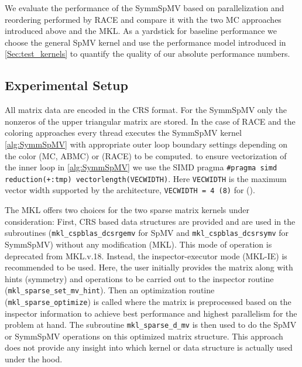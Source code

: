 
We evaluate the performance of the \acrshort{SymmSpMV} based on parallelization and reordering performed by \acrshort{RACE} and compare it with the two MC approaches introduced above and the \acrshort{MKL}. 
As a yardstick for baseline performance we choose the general \acrshort{SpMV} kernel and use the performance model introduced in \cref{Sec:test_kernels} to quantify the quality of our absolute performance numbers. 

\subsection{Experimental Setup}

All matrix data are encoded in the CRS format. For the \acrshort{SymmSpMV}  only the nonzeros of the upper triangular matrix are stored. In the case of RACE and the coloring approaches every thread executes the \acrshort{SymmSpMV} kernel \cref{alg:SymmSpMV} with appropriate outer loop boundary settings depending on the color (MC, ABMC) or \levelGroups (\acrshort{RACE}) to be computed. \Inorder to ensure vectorization of the inner loop in \cref{alg:SymmSpMV} we use the SIMD pragma \texttt{\#pragma simd reduction(+:tmp) vectorlength(VECWIDTH)}. Here \texttt{VECWIDTH} is the maximum vector width supported by the architecture, \ie \texttt{VECWIDTH = 4 (8)} for \IVB (\SKX).

The  \acrshort{MKL} offers two choices for the two sparse matrix kernels under consideration: First, CRS based data structures are provided and are used in the subroutines (\texttt{mkl\_cspblas\_dcsrgemv} for \acrshort{SpMV}  and  \texttt{mkl\_cspblas\_dcsrsymv} for \acrshort{SymmSpMV}) without any modification (MKL). This mode of operation is deprecated from \acrshort{MKL}.v.18. Instead, the inspector-executor mode (MKL-IE) is recommended to be used. Here, the user initially provides the matrix along with hints (\eg symmetry) and operations to be carried out to the inspector routine (\texttt{mkl\_sparse\_set\_mv\_hint}). Then an optimization routine (\texttt{mkl\_sparse\_optimize}) is called where the matrix is  preprocessed based on the inspector information to achieve best performance and highest parallelism for the problem at hand. The subroutine \texttt{mkl\_sparse\_d\_mv} is then used to do the \acrshort{SpMV} or \acrshort{SymmSpMV} operations on this optimized matrix structure. This approach does not provide any insight into which kernel or data structure is actually used under the hood.

